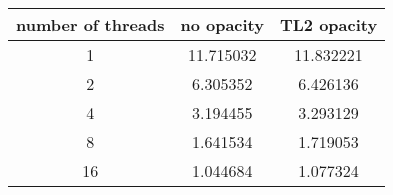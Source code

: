 \begin{tabular}{ |c|c|c| }
\hline
number of threads & no opacity & TL2 opacity\\\hline
1 & 11.715032 & 11.832221\\\hline
2 & 6.305352 & 6.426136\\\hline
4 & 3.194455 & 3.293129\\\hline
8 & 1.641534 & 1.719053\\\hline
16 & 1.044684 & 1.077324\\\hline
\end{tabular}

